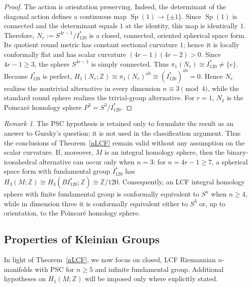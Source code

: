 \documentclass[12pt,oneside,a4paper]{article}
\theoremstyle{mytheorem}
\theoremstyle{remark}
\newtheorem{remark}[definition]{Remark}
\theoremstyle{definition}
\begin{document}
\begin{proof}
The action is orientation preserving. Indeed, the determinant of the
diagonal action defines a continuous map
\(\operatorname{Sp}(1)\to\{\pm1\}\).
Since \(\operatorname{Sp}(1)\) is connected and the determinant equals \(1\)
at the identity, this map is identically \(1\). Therefore,
\(N_r:=S^{4r-1}/I_{120}^*\)
is a closed, connected, oriented spherical space form. Its quotient round
metric has constant sectional curvature \(1\); hence it is locally
conformally flat and has scalar curvature \((4r-1)(4r-2)>0\).
Since \(4r-1\geq3\), the sphere \(S^{4r-1}\) is simply connected. Thus
\(\pi_1(N_r)\cong I_{120}^*\ne\{e\}\).
Because \(I_{120}^*\) is perfect,
\(H_1(N_r;\mathbb Z)\cong\pi_1(N_r)^{\mathrm{ab}}\cong(I_{120}^*)^{\mathrm{ab}}=0\).
Hence \(N_r\) realizes the nontrivial alternative in every dimension
\(n\equiv3\pmod4\), while the standard round sphere realizes the
trivial-group alternative. For \(r=1\), \(N_1\) is the Poincar\'e homology
sphere \(P^3=S^3/I_{120}^*\).
\end{proof}

\begin{remark}
The PSC  hypothesis is retained only to formulate the
result as an answer to Gursky's question; it is not used in the classification
argument. Thus the conclusions of Theorem~\ref{nLCF} remain valid without
any assumption on the scalar curvature. If, moreover, \(M\) is an integral
homology sphere, then the binary-icosahedral alternative can occur only when
\(n=3\): for \(n=4r-1\geq7\), a spherical space form with fundamental group
\(I_{120}^*\) has
\(H_3(M;\mathbb Z)\cong H_3(BI_{120}^*;\mathbb Z)\cong\mathbb Z/120\).
Consequently, an LCF integral homology sphere with finite fundamental group
is conformally equivalent to \(S^n\) when \(n\geq4\), while in dimension
three it is conformally equivalent either to \(S^3\) or, up to orientation,
to the Poincar\'e homology sphere.
\end{remark}





\subsection{Properties of Kleinian Groups}

In light of Theorem~\ref{nLCF}, we now focus on closed, LCF Riemannian \(n\)-manifolds with PSC for \(n\geq5\) and infinite fundamental group. Additional hypotheses on \(H_1(M;\mathbb Z)\) will be imposed only where explicitly stated.
\end{document}
